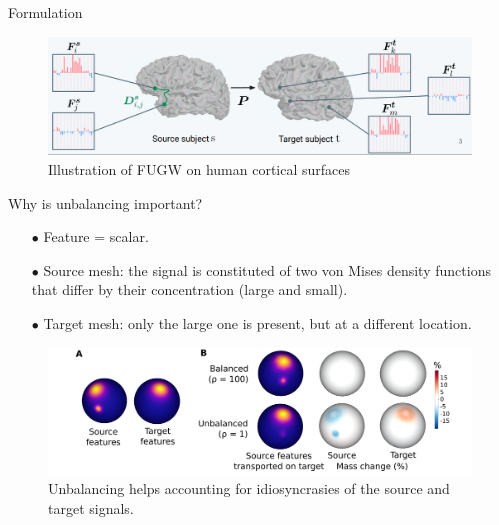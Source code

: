 \documentclass{beamer}
\begin{document}
\begin{frame}{Formulation}
\vspace{-0.5cm}
\begin{figure}
  \centering
  \includegraphics[width=1.\linewidth, keepaspectratio=true]{OT_new/fugw.png}
  \caption*{\scriptsize{Illustration of FUGW on human cortical surfaces}}
\end{figure}
\end{frame}

\begin{frame}{Why is unbalancing important?}
\scriptsize
\begin{itemize}
  \item[$\bullet$] Feature = scalar.
  \item[$\bullet$] Source mesh: the signal is constituted of two von Mises
  density functions that differ by their concentration (large and small).
  \item[$\bullet$] Target mesh: only the large one is present, but at a different location.
\end{itemize}
\vspace{0.2cm}
\begin{figure}
  \centering
  \includegraphics[width=1.\linewidth, keepaspectratio=true]{OT_new/toy_example.pdf}
  \caption*{\scriptsize{Unbalancing helps accounting for idiosyncrasies of the source and target signals.}}
\end{figure}


\end{frame}
\end{document}

